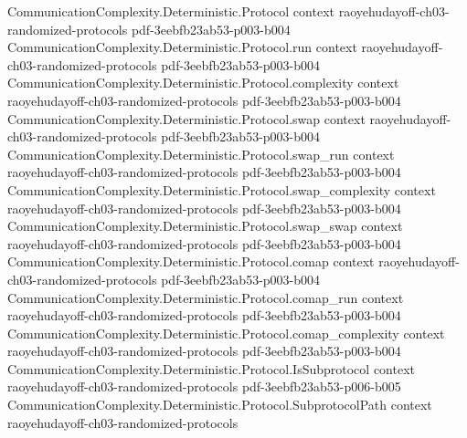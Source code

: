 \begin{theorem}
\label{CommunicationComplexity.Functions.Equality.publicCoin_communicationComplexity_le}
\leanok
{}
\proofstep
  {CommunicationComplexity.Deterministic.Protocol}
  {context}
  {raoyehudayoff-ch03-randomized-protocols}
  {pdf-3eebfb23ab53-p003-b004}
\proofstep
  {CommunicationComplexity.Deterministic.Protocol.run}
  {context}
  {raoyehudayoff-ch03-randomized-protocols}
  {pdf-3eebfb23ab53-p003-b004}
\proofstep
  {CommunicationComplexity.Deterministic.Protocol.complexity}
  {context}
  {raoyehudayoff-ch03-randomized-protocols}
  {pdf-3eebfb23ab53-p003-b004}
\proofstep
  {CommunicationComplexity.Deterministic.Protocol.swap}
  {context}
  {raoyehudayoff-ch03-randomized-protocols}
  {pdf-3eebfb23ab53-p003-b004}
\proofstep
  {CommunicationComplexity.Deterministic.Protocol.swap_run}
  {context}
  {raoyehudayoff-ch03-randomized-protocols}
  {pdf-3eebfb23ab53-p003-b004}
\proofstep
  {CommunicationComplexity.Deterministic.Protocol.swap_complexity}
  {context}
  {raoyehudayoff-ch03-randomized-protocols}
  {pdf-3eebfb23ab53-p003-b004}
\proofstep
  {CommunicationComplexity.Deterministic.Protocol.swap_swap}
  {context}
  {raoyehudayoff-ch03-randomized-protocols}
  {pdf-3eebfb23ab53-p003-b004}
\proofstep
  {CommunicationComplexity.Deterministic.Protocol.comap}
  {context}
  {raoyehudayoff-ch03-randomized-protocols}
  {pdf-3eebfb23ab53-p003-b004}
\proofstep
  {CommunicationComplexity.Deterministic.Protocol.comap_run}
  {context}
  {raoyehudayoff-ch03-randomized-protocols}
  {pdf-3eebfb23ab53-p003-b004}
\proofstep
  {CommunicationComplexity.Deterministic.Protocol.comap_complexity}
  {context}
  {raoyehudayoff-ch03-randomized-protocols}
  {pdf-3eebfb23ab53-p003-b004}
\proofstep
  {CommunicationComplexity.Deterministic.Protocol.IsSubprotocol}
  {context}
  {raoyehudayoff-ch03-randomized-protocols}
  {pdf-3eebfb23ab53-p006-b005}
\proofstep
  {CommunicationComplexity.Deterministic.Protocol.SubprotocolPath}
  {context}
  {raoyehudayoff-ch03-randomized-protocols}

\end{theorem}
